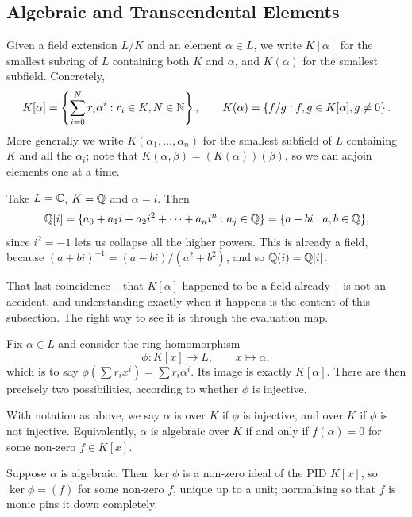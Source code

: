 \documentclass[a4paper]{scrartcl}
\begin{document}
\subsection{Algebraic and Transcendental Elements}

Given a field extension $L/K$ and an element $\alpha \in L$, we write $K[\alpha]$ for the smallest subring of $L$ containing both $K$ and $\alpha$, and $K(\alpha)$ for the smallest subfield. Concretely,
$$K[\alpha] = \left\{ \sum_{i=0}^N r_i \alpha^i : r_i \in K, N \in \mathbb{N} \right\}, \qquad K(\alpha) = \left\{ f/g : f, g \in K[\alpha], g \neq 0 \right\}.$$
More generally we write $K(\alpha_1, \dots, \alpha_n)$ for the smallest subfield of $L$ containing $K$ and all the $\alpha_i$; note that $K(\alpha, \beta) = (K(\alpha))(\beta)$, so we can adjoin elements one at a time.

\begin{example}
	Take $L = \mathbb{C}$, $K = \mathbb{Q}$ and $\alpha = i$. Then
	$$\mathbb{Q}[i] = \{a_0 + a_1 i + a_2 i^2 + \dots + a_n i^n : a_j \in \mathbb{Q}\} = \{a + bi : a, b \in \mathbb{Q}\},$$
	since $i^2 = -1$ lets us collapse all the higher powers. This is already a field, because $(a+bi)^{-1} = (a - bi)/(a^2+b^2)$, and so $\mathbb{Q}(i) = \mathbb{Q}[i]$.
\end{example}

That last coincidence -- that $K[\alpha]$ happened to be a field already -- is not an accident, and understanding exactly when it happens is the content of this subsection. The right way to see it is through the evaluation map.

Fix $\alpha \in L$ and consider the ring homomorphism
$$\phi : K[x] \to L, \qquad x \mapsto \alpha,$$
which is to say $\phi\left(\sum r_i x^i\right) = \sum r_i \alpha^i$. Its image is exactly $K[\alpha]$. There are then precisely two possibilities, according to whether $\phi$ is injective.

\begin{definition}
	With notation as above, we say $\alpha$ is  over $K$ if $\phi$ is injective, and  over $K$ if $\phi$ is not injective. Equivalently, $\alpha$ is algebraic over $K$ if and only if $f(\alpha) = 0$ for some non-zero $f \in K[x]$.
\end{definition}

Suppose $\alpha$ is algebraic. Then $\ker \phi$ is a non-zero ideal of the PID $K[x]$, so $\ker \phi = (f)$ for some non-zero $f$, unique up to a unit; normalising so that $f$ is monic pins it down completely.
\end{document}

